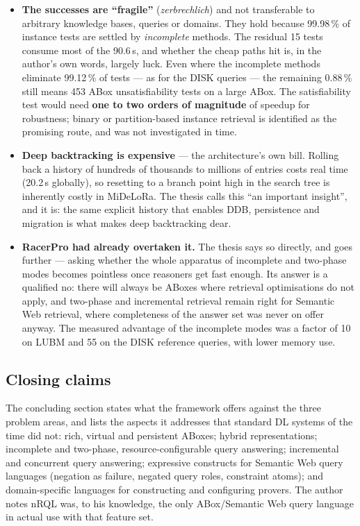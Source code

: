 \documentclass[11pt,a4paper,DIV=12,parskip=half]{scrartcl}
\begin{document}
\begin{itemize}
\item \textbf{The successes are \enquote{fragile}} (\emph{zerbrechlich}) and not
  transferable to arbitrary knowledge bases, queries or domains. They hold
  because 99.98\,\% of instance tests are settled by \emph{incomplete} methods.
  The residual 15 tests consume most of the 90.6\,s, and whether the cheap paths
  hit is, in the author's own words, largely luck. Even where the incomplete
  methods eliminate 99.12\,\% of tests --- as for the DISK queries --- the
  remaining 0.88\,\% still means 453 ABox unsatisfiability tests on a large ABox.
  The satisfiability test would need \textbf{one to two orders of magnitude} of
  speedup for robustness; binary or partition-based instance retrieval is
  identified as the promising route, and was not investigated in time.

\item \textbf{Deep backtracking is expensive} --- the architecture's own bill.
  Rolling back a history of hundreds of thousands to millions of entries costs
  real time (20.2\,s globally), so resetting to a branch point high in the search
  tree is inherently costly in MiDeLoRa. The thesis calls this \enquote{an
  important insight}, and it is: the same explicit history that enables DDB,
  persistence and migration is what makes deep backtracking dear.

\item \textbf{RacerPro had already overtaken it.} The thesis says so directly, and
  goes further --- asking whether the whole apparatus of incomplete and two-phase
  modes becomes pointless once reasoners get fast enough. Its answer is a
  qualified no: there will always be ABoxes where retrieval optimisations do not
  apply, and two-phase and incremental retrieval remain right for Semantic Web
  retrieval, where completeness of the answer set was never on offer anyway. The
  measured advantage of the incomplete modes was a factor of 10 on LUBM and 55 on
  the DISK reference queries, with lower memory use.
\end{itemize}

\subsection{Closing claims}

The concluding section states what the framework offers against the three problem
areas, and lists the aspects it addresses that standard DL systems of the time
did not: rich, virtual and persistent ABoxes; hybrid representations; incomplete
and two-phase, resource-configurable query answering; incremental and concurrent
query answering; expressive constructs for Semantic Web query languages
(negation as failure, negated query roles, constraint atoms); and domain-specific
languages for constructing and configuring provers. The author notes nRQL was, to
his knowledge, the only ABox/Semantic Web query language in actual use with that
feature set.
\end{document}
